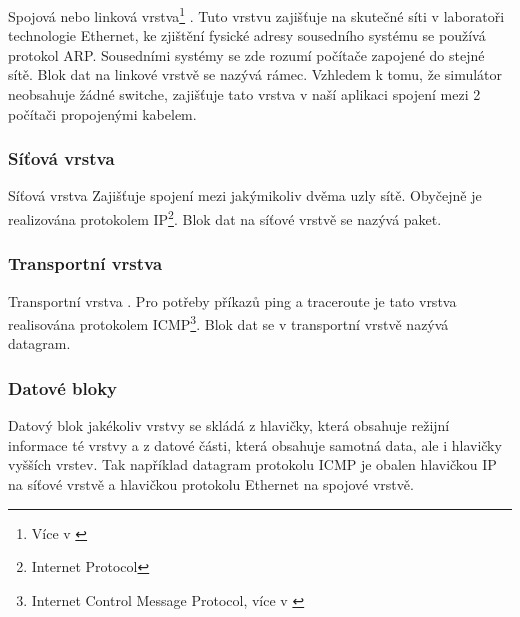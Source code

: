 Spojová nebo linková vrstva\footnote{Více v \cite{wiki:linkova_vrstva}} \cite{wiki:referencni_model}. Tuto vrstvu zajišťuje na skutečné síti v laboratoři technologie Ethernet\cite{wiki:ethernet}, ke zjištění fysické adresy sousedního systému se používá protokol ARP\cite{wiki:arp}. Sousedními systémy se zde rozumí počítače zapojené do stejné sítě. Blok dat na linkové vrstvě se nazývá rámec. Vzhledem k tomu, že simulátor neobsahuje žádné switche, zajišťuje tato vrstva v naší aplikaci spojení mezi 2 počítači propojenými kabelem.

\subsubsection{Síťová vrstva}

Síťová vrstva \cite{wiki:referencni_model} Zajišťuje spojení mezi jakýmikoliv dvěma uzly sítě. Obyčejně je realizována protokolem IP\footnote{Internet Protocol}. Blok dat na síťové vrstvě se nazývá paket.

\subsubsection{Transportní vrstva}

Transportní vrstva \cite{wiki:referencni_model}. Pro potřeby příkazů ping a traceroute je tato vrstva realisována protokolem ICMP\footnote{Internet Control Message Protocol, více v \cite{wiki:icmp}}. Blok dat se v transportní vrstvě nazývá datagram.

\subsubsection{Datové bloky}\label{datove_bloky}

Datový blok jakékoliv vrstvy se skládá z hlavičky, která obsahuje režijní informace té vrstvy a z datové části, která obsahuje samotná data, ale i hlavičky vyšších vrstev. Tak například datagram protokolu ICMP je obalen hlavičkou IP na síťové vrstvě a hlavičkou protokolu Ethernet na spojové vrstvě.


